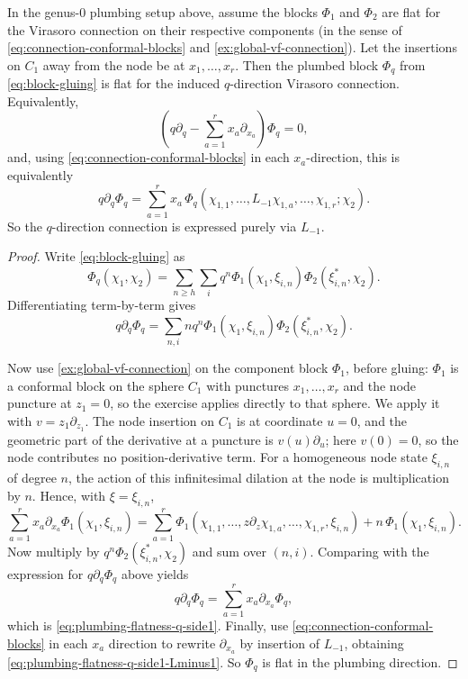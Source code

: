 \documentclass[12pt,letterpaper,reqno]{amsart}
\numberwithin{equation}{section}
\DeclareRobustCommand{\fixme}[1]{\leavevmode{\color{orange}[#1]}}
\begin{document}
\begin{prop}\label{prop:plumbing-virasoro-connection-g0}
In the genus-$0$ plumbing setup above, assume the blocks $\Phi_1$ and $\Phi_2$ are flat for the Virasoro
connection on their respective components (in the sense of \eqref{eq:connection-conformal-blocks} and
\autoref{ex:global-vf-connection}).
Let the insertions on $C_1$ away from the node be at $x_1,\dots,x_r$.
Then the plumbed block $\Phi_q$ from \eqref{eq:block-gluing} is flat for the induced $q$-direction Virasoro connection.
Equivalently,
\begin{equation}\label{eq:plumbing-flatness-q-side1}
\left(q\partial_q - \sum_{a=1}^r x_a\partial_{x_a}\right)\Phi_q = 0,
\end{equation}
and, using \eqref{eq:connection-conformal-blocks} in each $x_a$-direction, this is equivalently
\begin{equation}\label{eq:plumbing-flatness-q-side1-Lminus1}
q\partial_q\Phi_q
=
\sum_{a=1}^r x_a\,
\Phi_q(\chi_{1,1},\dots,L_{-1}\chi_{1,a},\dots,\chi_{1,r};\chi_2).
\end{equation}
So the $q$-direction connection is expressed purely via $L_{-1}$.
\end{prop}

\fixme{check this prop and proof carefully}

\begin{proof}
Write \eqref{eq:block-gluing} as
\[
\Phi_q(\chi_1,\chi_2)=\sum_{n\ge h}\sum_i q^n
\Phi_1(\chi_1,\xi_{i,n})\Phi_2(\xi_{i,n}^*,\chi_2).
\]
Differentiating term-by-term gives
\[
q\partial_q\Phi_q
=
\sum_{n,i} n q^n\Phi_1(\chi_1,\xi_{i,n})\Phi_2(\xi_{i,n}^*,\chi_2).
\]

Now use \autoref{ex:global-vf-connection} on the component block $\Phi_1$,
before gluing: $\Phi_1$ is a conformal block on the sphere $C_1$ with punctures
$x_1,\dots,x_r$ and the node puncture at $z_1=0$, so the exercise applies directly to that sphere.
We apply it with $v=z_1\partial_{z_1}$.
The node insertion on $C_1$ is at coordinate $u=0$, and the geometric part of the derivative at a puncture is
$v(u)\partial_u$; here $v(0)=0$, so the node contributes no position-derivative term.
For a homogeneous node state $\xi_{i,n}$ of degree $n$, the action of this infinitesimal dilation at the node is multiplication by $n$.
Hence, with $\xi=\xi_{i,n}$,
\[
\sum_{a=1}^r x_a\partial_{x_a}\Phi_1(\chi_1,\xi_{i,n})
=
\sum_{a=1}^r \Phi_1(\chi_{1,1},\dots,z\partial_z\chi_{1,a},\dots,\chi_{1,r},\xi_{i,n})
+ n\,\Phi_1(\chi_1,\xi_{i,n}).
\]
Now multiply by $q^n\Phi_2(\xi_{i,n}^*,\chi_2)$ and sum over $(n,i)$.
Comparing with the expression for $q\partial_q\Phi_q$ above yields
\[
q\partial_q\Phi_q=\sum_{a=1}^r x_a\partial_{x_a}\Phi_q,
\]
which is \eqref{eq:plumbing-flatness-q-side1}.
Finally, use \eqref{eq:connection-conformal-blocks} in each $x_a$ direction to rewrite
$\partial_{x_a}$ by insertion of $L_{-1}$, obtaining
\eqref{eq:plumbing-flatness-q-side1-Lminus1}.
So $\Phi_q$ is flat in the plumbing direction.
\end{proof}
\end{document}
